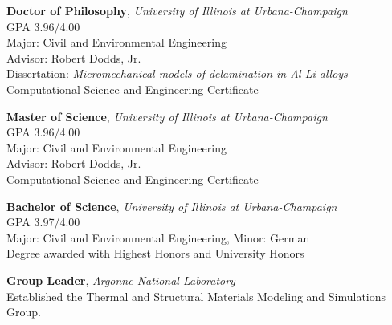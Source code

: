 \usepackage{ifthen}
\usepackage[sorting=ydnt,style=numeric,defernumbers]{biblatex}










\makecvtitle


\textbf{Doctor of Philosophy},  \emph{University of Illinois at Urbana-Champaign}\\
GPA 3.96/4.00\\
Major: Civil and Environmental Engineering\\
Advisor: Robert Dodds, Jr. \\
Dissertation: \textit{Micromechanical models of delamination in Al-Li
alloys}\\
Computational Science and Engineering Certificate

\textbf{Master of Science},  \emph{University of Illinois at Urbana-Champaign}\\
GPA 3.96/4.00\\
Major: Civil and Environmental Engineering\\
Advisor: Robert Dodds, Jr. \\
Computational Science and Engineering Certificate

\textbf{Bachelor of Science},  \emph{University of Illinois at Urbana-Champaign}\\
GPA 3.97/4.00\\
Major: Civil and Environmental Engineering, Minor: German\\
Degree awarded with Highest Honors and University Honors 


\textbf{Group Leader}, \emph{Argonne National Laboratory}
\\
Established the Thermal and Structural Materials Modeling and Simulations Group.

